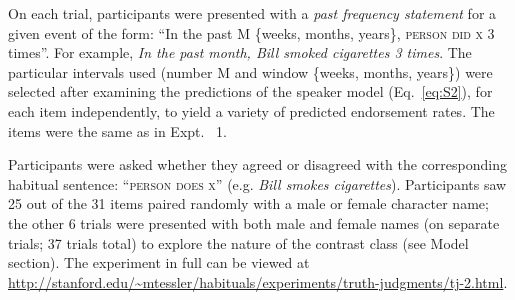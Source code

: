 \documentclass[10pt,letterpaper]{article}
\newcommand{\ndg}[1]{\textcolor{Green}{[ndg: #1]}}
\begin{document}
On each trial, participants were presented with a \emph{past frequency statement} for a given event of the form: ``In the past M \{weeks, months, years\}, \textsc{person} \textsc{did x} 3 times''.
For example, \emph{In the past month, Bill smoked cigarettes 3 times}.
The particular intervals used (number M and window \{weeks, months, years\}) were selected after examining the predictions of the speaker model (Eq.~\ref{eq:S2}), for each item independently, to yield a variety of predicted endorsement rates.
The items were the same as in Expt. ~1.

Participants were asked whether they agreed or disagreed with the corresponding habitual sentence: ``\textsc{person does x}'' (e.g. \emph{Bill smokes cigarettes}).
Participants saw 25 out of the 31 items paired randomly with a male or female character name; the other 6 trials were presented with both male and female names (on separate trials; 37 trials total) to explore the nature of the contrast class (see Model section). 
The experiment in full can be viewed at \url{http://stanford.edu/~mtessler/habituals/experiments/truth-judgments/tj-2.html}.



\end{document}
